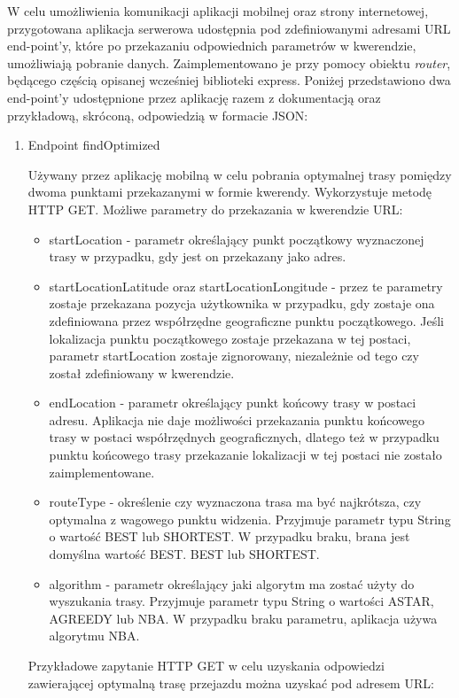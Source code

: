W celu umożliwienia komunikacji aplikacji mobilnej oraz strony internetowej, przygotowana aplikacja serwerowa udostępnia pod zdefiniowanymi adresami URL end-point’y, które po przekazaniu odpowiednich parametrów w kwerendzie, umożliwiają pobranie danych. Zaimplementowano je przy pomocy obiektu \textit{router}, będącego częścią opisanej wcześniej biblioteki express.
Poniżej przedstawiono dwa end-point’y udostępnione przez aplikację razem z dokumentacją oraz przykładową, skróconą, odpowiedzią w formacie JSON:
\begin{enumerate}
\item Endpoint findOptimized

Używany przez aplikację mobilną w celu pobrania optymalnej trasy pomiędzy dwoma punktami przekazanymi w formie kwerendy. Wykorzystuje metodę HTTP GET. Możliwe parametry do przekazania w kwerendzie URL:

\begin{itemize}
\item startLocation - parametr określający punkt początkowy wyznaczonej trasy w przypadku, gdy jest on przekazany jako adres.
\item startLocationLatitude oraz startLocationLongitude - przez te parametry zostaje przekazana pozycja użytkownika w przypadku, gdy zostaje ona zdefiniowana przez współrzędne geograficzne punktu początkowego. Jeśli lokalizacja punktu początkowego zostaje przekazana w tej postaci, parametr startLocation zostaje zignorowany, niezależnie od tego czy został zdefiniowany w kwerendzie.
\item endLocation - parametr określający punkt końcowy trasy w postaci adresu. Aplikacja nie daje możliwości przekazania punktu końcowego trasy w postaci współrzędnych geograficznych, dlatego też w przypadku punktu końcowego trasy przekazanie lokalizacji w tej postaci nie zostało zaimplementowane.
\item routeType - określenie czy wyznaczona trasa ma być najkrótsza, czy optymalna z wagowego punktu widzenia. Przyjmuje parametr typu String o wartość BEST lub SHORTEST. W przypadku braku, brana jest domyślna wartość BEST.
BEST lub SHORTEST.
\item algorithm - parametr określający jaki algorytm ma zostać użyty do wyszukania trasy. Przyjmuje parametr typu String o wartości ASTAR, AGREEDY lub NBA. W przypadku braku parametru, aplikacja używa algorytmu NBA.
\end{itemize}

Przykładowe zapytanie HTTP GET w celu uzyskania odpowiedzi zawierającej optymalną trasę przejazdu można uzyskać pod adresem URL:


\end{enumerate}
